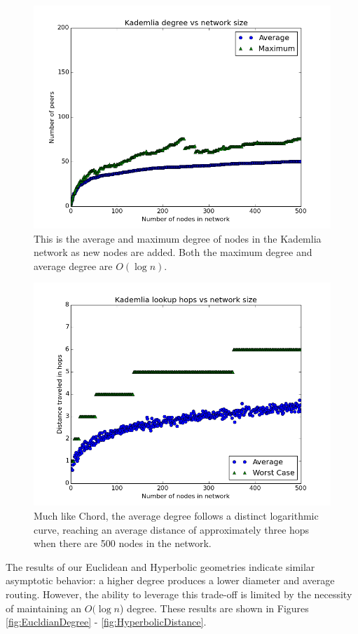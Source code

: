 \begin{figure}
	\centering
	\includegraphics[width=0.75\linewidth]{figs/KademliaDegree}
	\caption{This is the average and maximum degree of nodes in the Kademlia network as new nodes are added.  Both the maximum degree and average degree are $O(\log n)$.}
	\label{fig:KademliaDegree}
\end{figure}
\begin{figure}
	\centering
	\includegraphics[width=0.75\linewidth]{figs/KademliaDistance}
	\caption{Much like Chord, the average degree follows a distinct logarithmic curve, reaching an average distance of approximately three hops when there are 500 nodes in the network.}
	\label{fig:KademliaDistance}
\end{figure}



The results of our Euclidean and Hyperbolic geometries indicate similar asymptotic behavior: a higher degree produces a lower diameter and average routing. 
However, the ability to leverage this trade-off is limited by the necessity of maintaining an $ O(\log n $) degree.
These results are shown in Figures \ref{fig:EucldianDegree} - \ref{fig:HyperbolicDistance}.

